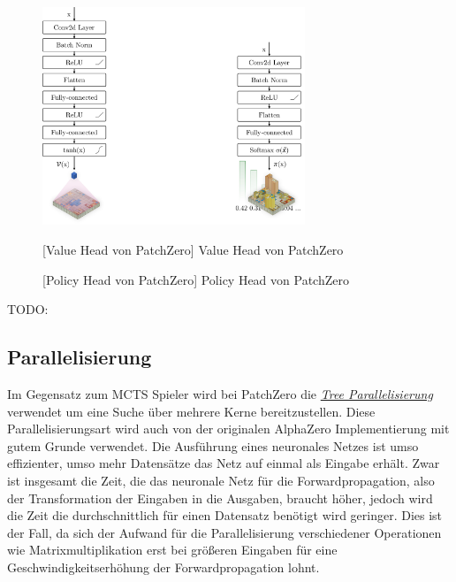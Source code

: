 \begin{figure}[!ht]
    \centering
    \includegraphics[width=0.7\textwidth]{res/pictures/value-and-policy-head.pdf}
    \\
    \begin{minipage}{.49\textwidth}
        \centering
        [Value Head von PatchZero]{\unskip}
        Value Head von PatchZero
        \label{fig:value-head}
    \end{minipage}
    \hfill
    \begin{minipage}{.49\textwidth}
        \centering
        [Policy Head von PatchZero]{\unskip}
        Policy Head von PatchZero
        \label{fig:policy-head}
    \end{minipage}
\end{figure}

TODO:

\subsection{Parallelisierung}

Im Gegensatz zum \ac{MCTS} Spieler wird bei PatchZero die \hyperref[text:tree-parallelization]{\emph{Tree Parallelisierung}} verwendet um eine Suche über mehrere Kerne bereitzustellen. Diese Parallelisierungsart wird auch von der originalen AlphaZero Implementierung mit gutem Grunde verwendet. Die Ausführung eines neuronales Netzes ist umso effizienter, umso mehr Datensätze das Netz auf einmal als Eingabe erhält. Zwar ist insgesamt die Zeit, die das neuronale Netz für die Forwardpropagation, also der Transformation der Eingaben in die Ausgaben, braucht höher, jedoch wird die Zeit die durchschnittlich für einen Datensatz benötigt wird geringer. Dies ist der Fall, da sich der Aufwand für die Parallelisierung verschiedener Operationen wie Matrixmultiplikation erst bei größeren Eingaben für eine Geschwindigkeitserhöhung der Forwardpropagation lohnt.

